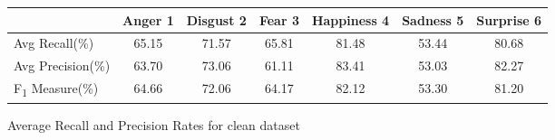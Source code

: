 \begin{figure}[h]
\begin{center}
\caption{Average Recall and Precision Rates for clean dataset}
\begin{tabular}{ | l || c | c | c | c | c | c | }
    \hline
          & Anger 1 & Disgust 2 & Fear 3 & Happiness 4 & Sadness 5 & Surprise 6 \\ \hline \hline
        Avg Recall(\%) & 65.15 & 71.57 & 65.81 & 81.48 & 53.44 & 80.68 \\ \hline
        Avg Precision(\%) & 63.70 & 73.06 & 61.11 & 83.41 & 53.03 & 82.27\\ \hline
        F\textsubscript{1} Measure(\%) & 64.66 & 72.06 & 64.17 & 82.12 & 53.30 & 81.20 \\ \hline
    \end{tabular}
    \label{fig:averageRecall}
\end{center}
\end{figure}



